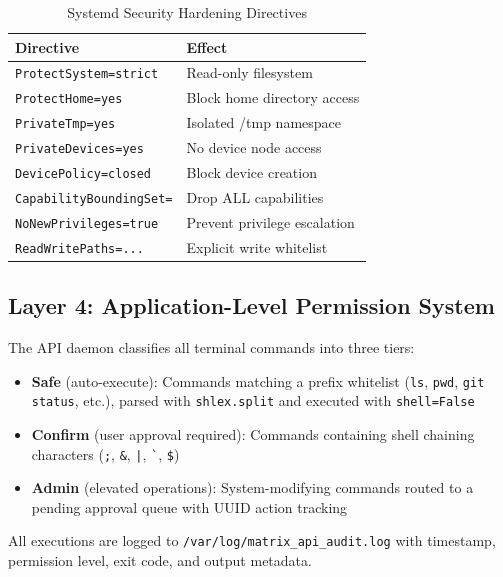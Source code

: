 \documentclass[conference]{IEEEtran}
\begin{document}
\begin{table}[htbp]
\caption{Systemd Security Hardening Directives}
\label{tab:systemd}
\centering
\renewcommand{\arraystretch}{1.15}
\begin{tabular}{@{}ll@{}}
\toprule
\textbf{Directive} & \textbf{Effect} \\
\midrule
\texttt{ProtectSystem=strict} & Read-only filesystem \\
\texttt{ProtectHome=yes} & Block home directory access \\
\texttt{PrivateTmp=yes} & Isolated /tmp namespace \\
\texttt{PrivateDevices=yes} & No device node access \\
\texttt{DevicePolicy=closed} & Block device creation \\
\texttt{CapabilityBoundingSet=} & Drop ALL capabilities \\
\texttt{NoNewPrivileges=true} & Prevent privilege escalation \\
\texttt{ReadWritePaths=...} & Explicit write whitelist \\
\bottomrule
\end{tabular}
\end{table}

\subsection{Layer 4: Application-Level Permission System}

The API daemon classifies all terminal commands into three tiers:

\begin{itemize}
    \item \textbf{Safe} (auto-execute): Commands matching a prefix whitelist (\texttt{ls}, \texttt{pwd}, \texttt{git status}, etc.), parsed with \texttt{shlex.split} and executed with \texttt{shell=False}
    \item \textbf{Confirm} (user approval required): Commands containing shell chaining characters (\texttt{;}, \texttt{\&}, \texttt{|}, \texttt{\`{}}, \texttt{\$})
    \item \textbf{Admin} (elevated operations): System-modifying commands routed to a pending approval queue with UUID action tracking
\end{itemize}

All executions are logged to \texttt{/var/log/matrix\_api\_audit.log} with timestamp, permission level, exit code, and output metadata.

\end{document}
